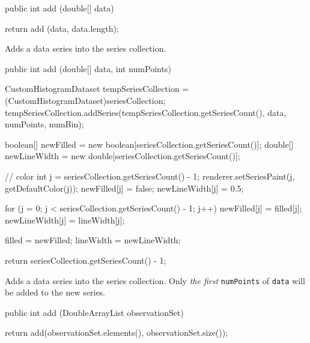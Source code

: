 \begin{code}

   public int add (double[] data) \begin{hide} {
      return add (data, data.length);
   }\end{hide}
\end{code}
\begin{tabb}
   Adds a data series into the series collection.
\end{tabb}
\begin{htmlonly}
\end{htmlonly}
\begin{code}

   public int add (double[] data, int numPoints) \begin{hide} {
      CustomHistogramDataset tempSeriesCollection = (CustomHistogramDataset)seriesCollection;
      tempSeriesCollection.addSeries(tempSeriesCollection.getSeriesCount(),
            data, numPoints, numBin);

      boolean[] newFilled = new boolean[seriesCollection.getSeriesCount()];
      double[] newLineWidth = new double[seriesCollection.getSeriesCount()];

      // color
      int j = seriesCollection.getSeriesCount() - 1;
      renderer.setSeriesPaint(j, getDefaultColor(j));
      newFilled[j] = false;
      newLineWidth[j] = 0.5;

      for (j = 0; j < seriesCollection.getSeriesCount() - 1; j++) {
         newFilled[j] = filled[j];
         newLineWidth[j] = lineWidth[j];
      }

      filled = newFilled;
      lineWidth = newLineWidth;

      return seriesCollection.getSeriesCount() - 1;
   }\end{hide}
\end{code}
\begin{tabb}
   Adds a data series into the series collection. Only \emph{the first}
  \texttt{numPoints} of \texttt{data} will be added to the new series.
\end{tabb}
\begin{htmlonly}
\end{htmlonly}
\begin{code}

   public int add (DoubleArrayList observationSet) \begin{hide} {
      return add(observationSet.elements(), observationSet.size());
   }\end{hide}
\end{code}
